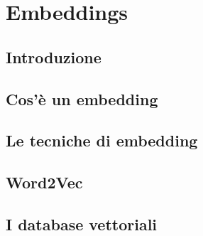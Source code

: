 \chapter{Embeddings}
\label{Embeddings}
\section{Introduzione}
\section{Cos'è un embedding}
\section{Le tecniche di embedding}
\section{Word2Vec}
\section{I database vettoriali}